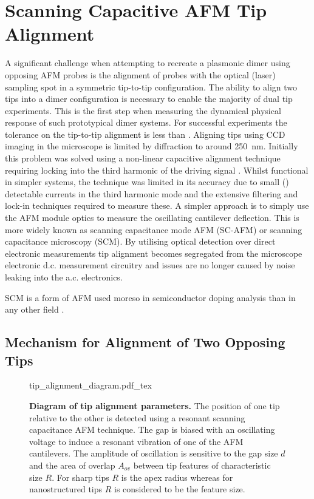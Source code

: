 \documentclass{article}
\begin{document}
\section{Scanning Capacitive AFM Tip Alignment}
\label{sec:tip_alignment}

A significant challenge when attempting to recreate a plasmonic dimer using opposing AFM probes is the alignment of probes with the optical (laser) sampling spot in a symmetric tip-to-tip configuration. The ability to align two tips into a dimer configuration is necessary to enable the majority of dual tip experiments. This is the first step when measuring the dynamical physical response of such prototypical dimer systems.
For successful experiments the tolerance on the tip-to-tip alignment is less than . Aligning tips using CCD imaging in the microscope is limited by diffraction to around {\color{red}\SI{250}{nm}}. Initially this problem was solved using a non-linear capacitive alignment technique requiring locking into the third harmonic of the driving signal \cite{savage2011}. Whilst functional in simpler systems, the technique was limited in its accuracy due to small () detectable currents in the third harmonic mode and the extensive filtering and lock-in techniques required to measure these. A simpler approach is to simply use the AFM module optics to measure the oscillating cantilever deflection. This is more widely known as scanning capacitance mode AFM (SC-AFM) or scanning capacitance microscopy (SCM). By utilising optical detection over direct electronic measurements tip alignment becomes segregated from the microscope electronic d.c. measurement circuitry and issues are no longer caused by noise leaking into the a.c. electronics.

SCM is a form of AFM used moreso in semiconductor doping analysis than in any other field \cite{huang1995quantitative}.

\subsection{Mechanism for Alignment of Two Opposing Tips}

\begin{figure}[bt]
\centering
\fontsize{10pt}{1em}\selectfont
\def\svgwidth{0.65\textwidth}
{tip_alignment_diagram.pdf_tex}
\caption[Diagram of tip alignment parameters]{\textbf{Diagram of tip alignment parameters.} The position of one tip relative to the other is detected using a resonant scanning capacitance AFM technique. The gap is biased with an oscillating voltage to induce a resonant vibration of one of the AFM cantilevers. The amplitude of oscillation is sensitive to the gap size $d$ and the area of overlap $A_{ov}$ between tip features of characteristic size $R$. For sharp tips $R$ is the apex radius whereas for nanostructured tips $R$ is considered to be the feature size.}
\label{fig:tip_alignment_diagram}
\end{figure}
\end{document}
